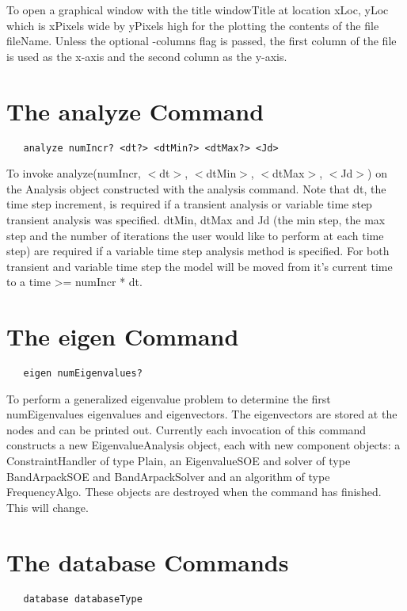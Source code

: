 \documentclass[12pt]{article}
\begin{document}
\noindent To open a graphical window with the title windowTitle at location
xLoc, yLoc which is xPixels wide by yPixels high for the plotting the
contents of the file fileName. Unless the optional -columns flag is
passed, the first column of the file is used as the x-axis and the
second column as the y-axis. 

\section {The analyze Command}
{\sf\small
\begin{verbatim}
   analyze numIncr? <dt?> <dtMin?> <dtMax?> <Jd>
\end{verbatim}
}

\noindent To invoke analyze(numIncr, $<$dt$>$, $<$dtMin$>$,
$<$dtMax$>$, $<$Jd$>$) on the Analysis object constructed with the
analysis command. Note that dt, the time step increment, is required
if a transient analysis or variable time step transient analysis was
specified. dtMin, dtMax and Jd (the min step, the max step and the
number of iterations the user would like to perform at each time step)
are required if a variable time step analysis method is specified.
For both transient and variable time step the model will be moved from
it's current time to a time >= numIncr * dt.



\section {The eigen Command}
{\sf\small
\begin{verbatim}
   eigen numEigenvalues?
\end{verbatim}
}

\noindent To perform a generalized eigenvalue problem to determine the
first numEigenvalues eigenvalues and eigenvectors. The eigenvectors
are stored at the nodes and can be printed out. Currently each
invocation of this command constructs a new EigenvalueAnalysis object,
each with new component objects: a ConstraintHandler of type Plain, an
EigenvalueSOE and solver of type BandArpackSOE and BandArpackSolver
and an algorithm of type FrequencyAlgo. These objects are destroyed
when the command has finished. This will change.

\section {The database Commands}
{\sf\small
\begin{verbatim}
   database databaseType 
\end{verbatim}
}
\end{document}
